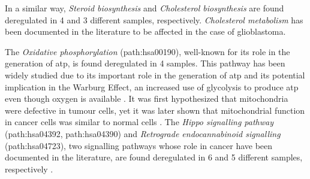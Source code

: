 In a similar way, \textit{Steroid biosynthesis} and \textit{Cholesterol biosynthesis} are found deregulated in 4 and 3 different samples, respectively.
\textit{Cholesterol metabolism} has been documented in the literature to be affected in the case of glioblastoma.

The \textit{Oxidative phosphorylation} (path:hsa00190), well-known for its role in the generation of \acrshort{atp}, is found deregulated in 4 samples.
This pathway has been widely studied due to its important role in the generation of \acrshort{atp} and its potential implication in the Warburg Effect, an increased use of glycolysis to produce \acrshort{atp} even though oxygen is available \cite*{Spinicci2022}.
It was first hypothesized that mitochondria were defective in tumour cells, yet it was later shown that mitochondrial function in cancer cells was similar to normal cells \cite*{Cairns2011}.
The \textit{Hippo signalling pathway} (path:hsa04392, path:hsa04390) and \textit{Retrograde endocannabinoid signalling} (path:hsa04723), two signalling pathways whose role in cancer have been documented in the literature, are found deregulated in 6 and 5 different samples, respectively \cite*{Wei2014,Liu2018,BasuRoy2015}.

